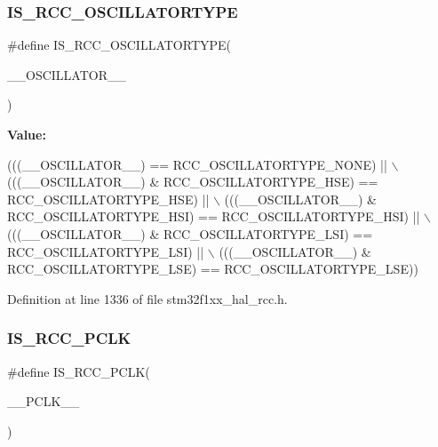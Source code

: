 \subsubsection{\texorpdfstring{I\+S\+\_\+\+R\+C\+C\+\_\+\+O\+S\+C\+I\+L\+L\+A\+T\+O\+R\+T\+Y\+PE}{IS\_RCC\_OSCILLATORTYPE}}
{\footnotesize\ttfamily \#define I\+S\+\_\+\+R\+C\+C\+\_\+\+O\+S\+C\+I\+L\+L\+A\+T\+O\+R\+T\+Y\+PE(\begin{DoxyParamCaption}\item[{}]{\+\_\+\+\_\+\+O\+S\+C\+I\+L\+L\+A\+T\+O\+R\+\_\+\+\_\+ }\end{DoxyParamCaption})}

{\bfseries Value\+:}
\begin{DoxyCode}
(((\_\_OSCILLATOR\_\_) == RCC\_OSCILLATORTYPE\_NONE)                           || \(\backslash\)
                                               (((\_\_OSCILLATOR\_\_) & RCC\_OSCILLATORTYPE\_HSE) == 
      RCC\_OSCILLATORTYPE\_HSE) || \(\backslash\)
                                               (((\_\_OSCILLATOR\_\_) & RCC\_OSCILLATORTYPE\_HSI) == 
      RCC\_OSCILLATORTYPE\_HSI) || \(\backslash\)
                                               (((\_\_OSCILLATOR\_\_) & RCC\_OSCILLATORTYPE\_LSI) == 
      RCC\_OSCILLATORTYPE\_LSI) || \(\backslash\)
                                               (((\_\_OSCILLATOR\_\_) & RCC\_OSCILLATORTYPE\_LSE) == 
      RCC\_OSCILLATORTYPE\_LSE))
\end{DoxyCode}


Definition at line 1336 of file stm32f1xx\+\_\+hal\+\_\+rcc.\+h.

\mbox{\label{group___r_c_c___private___macros_ga378b8fcc2e64326f6f98b30cb3fc22d9}} 
\subsubsection{\texorpdfstring{I\+S\+\_\+\+R\+C\+C\+\_\+\+P\+C\+LK}{IS\_RCC\_PCLK}}
{\footnotesize\ttfamily \#define I\+S\+\_\+\+R\+C\+C\+\_\+\+P\+C\+LK(\begin{DoxyParamCaption}\item[{}]{\+\_\+\+\_\+\+P\+C\+L\+K\+\_\+\+\_\+ }\end{DoxyParamCaption})}

